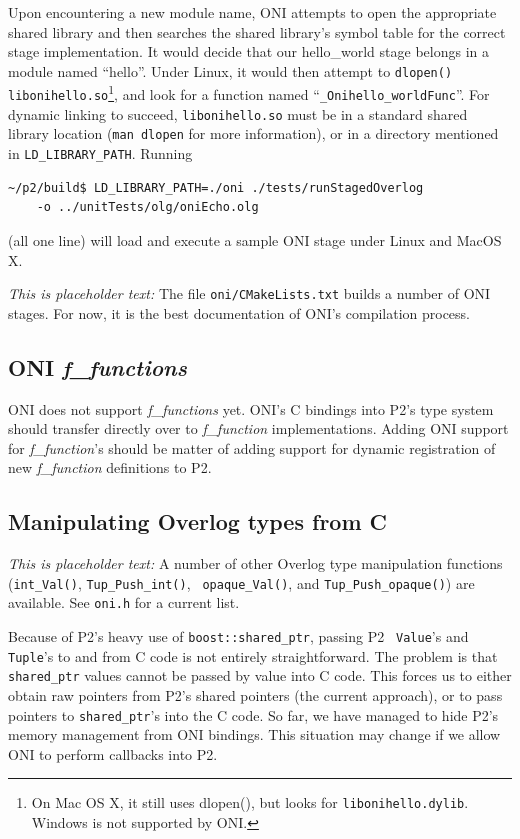\documentclass{article}
\begin{document}
Upon encountering a new module name, ONI attempts to open the
appropriate shared library and then searches the shared library's
symbol table for the correct stage implementation.  It would decide
that our hello\_world stage belongs in a module named ``hello''.
Under Linux, it would then attempt to {\tt dlopen()}
{\tt libonihello.so}\footnote{On Mac OS X, it still uses dlopen(), but
  looks for {\tt libonihello.dylib}.  Windows is not supported by ONI.},
and look for a function named ``{\tt \_Onihello\_worldFunc}''.  For
dynamic linking to succeed, {\tt libonihello.so} must be in a standard
shared library location ({\tt man dlopen} for more information), or in
a directory mentioned in {\tt LD\_LIBRARY\_PATH}.  Running

\begin{verbatim}
~/p2/build$ LD_LIBRARY_PATH=./oni ./tests/runStagedOverlog
    -o ../unitTests/olg/oniEcho.olg
\end{verbatim}
(all one line) will load and execute a sample ONI stage
under Linux and MacOS X.

{\em This is placeholder text:} The file {\tt oni/CMakeLists.txt}
builds a number of ONI stages.  For now, it is the best documentation
of ONI's compilation process.

\subsection{ONI {\em f\_functions}}

ONI does not support {\em f\_functions} yet.  ONI's C bindings into
P2's type system should transfer directly over to {\em f\_function}
implementations.  Adding ONI support for {\em f\_function}'s should be
matter of adding support for dynamic registration of new {\em f\_function}
definitions to P2.

\subsection{Manipulating Overlog types from C}

{\em This is placeholder text:} A number of other Overlog type
manipulation functions ({\tt int\_Val()}, {\tt Tup\_Push\_int()}, {\tt
  opaque\_Val()}, and {\tt Tup\_Push\_opaque()}) are available.  See
{\tt oni.h} for a current list.

Because of P2's heavy use of {\tt boost::shared\_ptr}, passing P2 {\tt
  Value}'s and {\tt Tuple}'s to and from C code is not entirely
straightforward.  The problem is that {\tt shared\_ptr} values cannot
be passed by value into C code.  This forces us to either obtain raw
pointers from P2's shared pointers (the current approach), or to pass
pointers to {\tt shared\_ptr}'s into the C code.  So far, we have
managed to hide P2's memory management from ONI bindings.  This
situation may change if we allow ONI to perform callbacks into P2.
\end{document}
